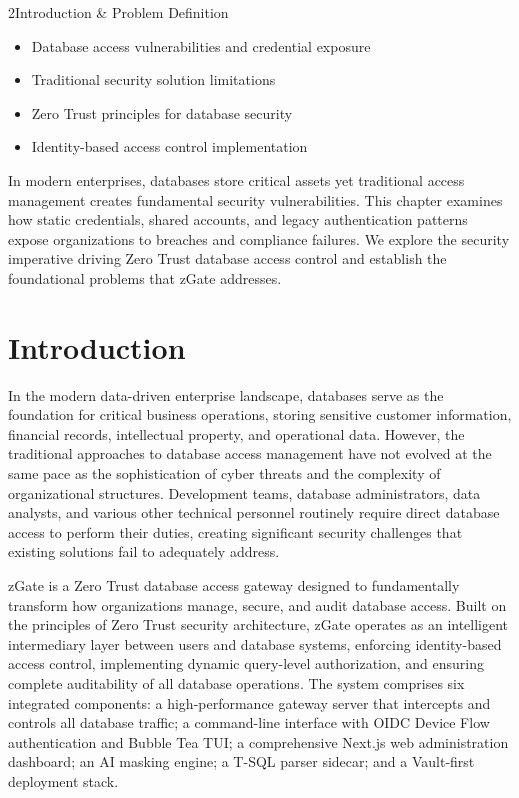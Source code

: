 
\begin{sectionintro}{2}{Introduction \& Problem Definition}{
  \begin{itemize}[leftmargin=1.5em]
    \item Database access vulnerabilities and credential exposure
    \item Traditional security solution limitations
    \item Zero Trust principles for database security
    \item Identity-based access control implementation
  \end{itemize}
}
In modern enterprises, databases store critical assets yet traditional access management creates fundamental security vulnerabilities. This chapter examines how static credentials, shared accounts, and legacy authentication patterns expose organizations to breaches and compliance failures. We explore the security imperative driving Zero Trust database access control and establish the foundational problems that zGate addresses.
\end{sectionintro}

\section{Introduction}
In the modern data-driven enterprise landscape, databases serve as the foundation for critical business operations, storing sensitive customer information, financial records, intellectual property, and operational data. However, the traditional approaches to database access management have not evolved at the same pace as the sophistication of cyber threats and the complexity of organizational structures. Development teams, database administrators, data analysts, and various other technical personnel routinely require direct database access to perform their duties, creating significant security challenges that existing solutions fail to adequately address.

zGate is a Zero Trust database access gateway designed to fundamentally transform how organizations manage, secure, and audit database access. Built on the principles of Zero Trust security architecture, zGate operates as an intelligent intermediary layer between users and database systems, enforcing identity-based access control, implementing dynamic query-level authorization, and ensuring complete auditability of all database operations. The system comprises six integrated components: a high-performance gateway server that intercepts and controls all database traffic; a command-line interface with OIDC Device Flow authentication and Bubble Tea TUI; a comprehensive Next.js web administration dashboard; an AI masking engine; a T-SQL parser sidecar; and a Vault-first deployment stack.

